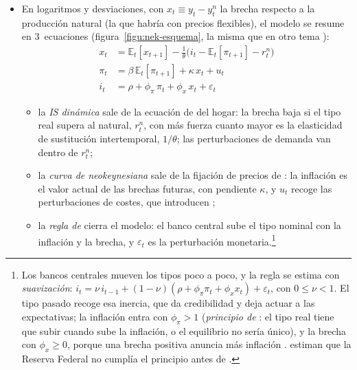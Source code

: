 \documentclass[11pt]{article}
\begin{document}
\begin{itemize}
\item En logaritmos y desviaciones, con $x_t\equiv y_t-y^n_t$ la brecha respecto a la producción natural (la que habría con precios flexibles), el modelo se resume en 3~ecuaciones (figura~\ref{figu:nek-esquema}, la misma que en otro tema )\nocite{ClaridaGaliGertler1999Science,Gali2015Monetary}:
  \begin{align}
  x_t&=\mathbb{E}_t[x_{t+1}]-\tfrac{1}{\theta}\big(i_t-\mathbb{E}_t[\pi_{t+1}]-r^n_t\big) \label{eq:is-dinamica}\\
  \pi_t&=\beta\,\mathbb{E}_t[\pi_{t+1}]+\kappa\,x_t+u_t \label{eq:nkpc}\\
  i_t&=\rho+\phi_\pi\,\pi_t+\phi_x\,x_t+\varepsilon_t \label{eq:taylor}
  \end{align}
  \begin{itemize}
  \item la \emph{IS dinámica} sale de la ecuación de  del hogar: la brecha baja si el tipo real supera al natural, $r^n_t$, con más fuerza cuanto mayor es la elasticidad de sustitución intertemporal, $1/\theta$; las perturbaciones de demanda van dentro de $r^n_t$;
  \item la \emph{curva de  neokeynesiana} sale de la fijación de precios de : la inflación es el valor actual de las brechas futuras, con pendiente $\kappa$, y $u_t$ recoge las perturbaciones de costes, que introducen \textcite{ClaridaGaliGertler1999Science};
  \item la \emph{regla de } cierra el modelo: el banco central sube el tipo nominal con la inflación y la brecha, y $\varepsilon_t$ es la perturbación monetaria\nocite{Taylor1993}.\footnote{Los bancos centrales mueven los tipos poco a poco, y la regla se estima con \emph{suavización}: $i_t=\nu\,i_{t-1}+(1-\nu)(\rho+\phi_\pi\pi_t+\phi_x x_t)+\varepsilon_t$, con $0\le\nu<1$. El tipo pasado recoge esa inercia, que da credibilidad y deja actuar a las expectativas; la inflación entra con $\phi_\pi>1$ (\emph{principio de }: el tipo real tiene que subir cuando sube la inflación, o el equilibrio no sería único), y la brecha con $\phi_x\ge0$, porque una brecha positiva anuncia más inflación . \textcite{ClaridaGaliGertler2000Rules} estiman que la Reserva Federal no cumplía el principio antes de .}
  \end{itemize}
\end{itemize}
\end{document}
